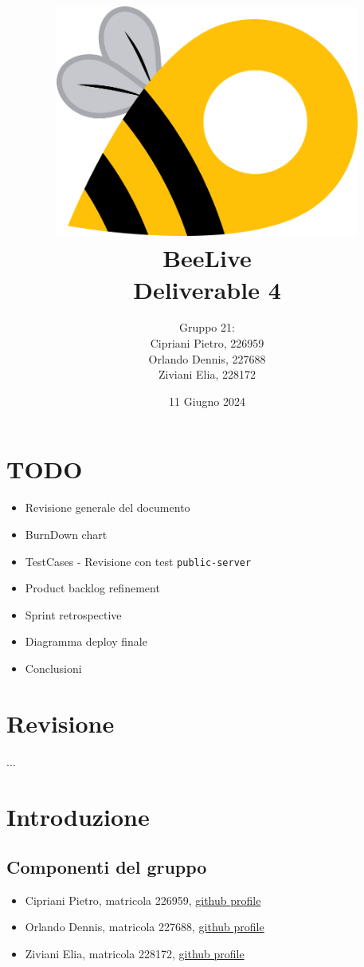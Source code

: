 \documentclass{article}
\title{\includegraphics[width=0.75\textwidth]{Images/BeeLive-Logo.png}\\\vspace{100pt}
\LARGE{\textbf{BeeLive\\Deliverable 4}}}
\author{Gruppo 21:\\
Cipriani Pietro, 226959\\
Orlando Dennis, 227688\\
Ziviani Elia, 228172}
\date{11 Giugno 2024}
\begin{document}
\maketitle
\thispagestyle{firstpage} %
\clearpage

\pagestyle{nonplain} %

\renewcommand{\contentsname}{Indice}
\tableofcontents

\clearpage

\section{TODO}
\begin{itemize}
    \item Revisione generale del documento
    \item BurnDown chart
    \item TestCases - Revisione con test \texttt{public-server}
    \item Product backlog refinement
    \item Sprint retrospective
    \item Diagramma deploy finale
    \item Conclusioni
\end{itemize}

\clearpage

\section{Revisione}
...

\clearpage

\section{Introduzione}

\subsection{Componenti del gruppo}
\begin{itemize}
    \item Cipriani Pietro, matricola 226959, \lbrack\href{https://github.com/pietrocipriani}{github profile}\rbrack
    \item Orlando Dennis, matricola 227688, \lbrack\href{https://github.com/dennisorlando}{github profile}\rbrack
    \item Ziviani Elia, matricola 228172, \lbrack\href{https://github.com/ELI20ZIVI}{github profile}\rbrack
\end{itemize}
\end{document}
